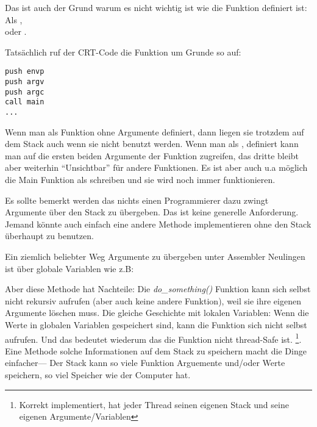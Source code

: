 \label{main_arguments}
\par
Das ist auch der Grund warum es nicht wichtig ist wie die \main Funktion definiert ist: Als \main, \\
 oder .

Tatsächlich ruf der \ac{CRT}-Code die \main Funktion um Grunde so auf:
	
\begin{lstlisting}[style=customasmx86]
push envp
push argv
push argc
call main
...
\end{lstlisting}

Wenn man \main als \main Funktion ohne Argumente definiert, dann liegen sie trotzdem auf dem Stack auch wenn sie 
nicht benutzt werden. Wenn man \main als , definiert kann man auf die ersten beiden
Argumente der Funktion zugreifen, das dritte bleibt aber weiterhin ``Unsichtbar'' für andere Funktionen.
Es ist aber auch u.a möglich die Main Funktion als  schreiben und sie wird noch immer funktionieren.



Es sollte bemerkt werden das nichts einen Programmierer dazu zwingt Argumente über den Stack zu übergeben. Das ist
keine generelle Anforderung. Jemand könnte auch einfach eine andere Methode implementieren ohne den Stack überhaupt zu benutzen.

Ein ziemlich beliebter Weg Argumente zu übergeben unter Assembler Neulingen ist über globale Variablen wie z.B:



Aber diese Methode hat Nachteile: Die \emph{do\_something()} Funktion kann sich selbst nicht rekursiv aufrufen (aber auch keine andere Funktion),
weil sie ihre eigenen Argumente löschen muss.
Die gleiche Geschichte mit lokalen Variablen: Wenn die Werte in globalen Variablen gespeichert sind, kann die Funktion sich nicht selbst aufrufen.
Und das bedeutet wiederum das die Funktion nicht thread-Safe ist.
\footnote{Korrekt implementiert, hat jeder Thread seinen eigenen Stack und seine eigenen Argumente/Variablen}.
Eine Methode solche Informationen auf dem Stack zu speichern macht die Dinge einfacher--- Der Stack kann so viele Funktion Arguemente und/oder Werte speichern,
so viel Speicher wie der Computer hat.

